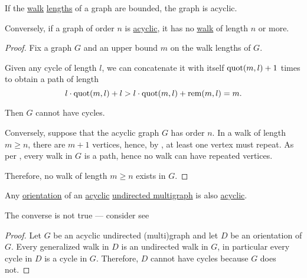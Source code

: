 \begin{proposition}\label{thm:acyclic_graph_walk_length}
  If the \hyperref[def:graph_walk]{walk} \hyperref[def:graph_walk/length]{lengths} of a graph are bounded, the graph is acyclic.

  Conversely, if a graph of  order \( n \) is \hyperref[def:acyclic_graph]{acyclic}, it has no \hyperref[def:graph_walk]{walk} of length \( n \) or more.
\end{proposition}
\begin{proof}
  \SufficiencySubProof Fix a graph \( G \) and an upper bound \( m \) on the walk lengths of \( G \).

  Given any cycle of length \( l \), we can concatenate it with itself \( \operatorname{quot}(m, l) + 1 \) times to obtain a path of length
  \begin{equation*}
    l \cdot \operatorname{quot}(m, l) + l > l \cdot \operatorname{quot}(m, l) + \operatorname{rem}(m, l) = m.
  \end{equation*}

  Then \( G \) cannot have cycles.

  \NecessitySubProof Conversely, suppose that the acyclic graph \( G \) has order \( n \). In a walk of length \( m \geq n \), there are \( m + 1 \) vertices, hence, by , at least one vertex must repeat. As per , every walk in \( G \) is a path, hence no walk can have repeated vertices.

  Therefore, no walk of length \( m \geq n \) exists in \( G \).
\end{proof}

\begin{proposition}\label{thm:acyclic_undirected_graph_orientation}
  Any \hyperref[def:multigraph_orientation]{orientation} of an \hyperref[def:acyclic_graph]{acyclic} \hyperref[def:hypergraph/multigraph]{undirected multigraph} is also \hyperref[def:acyclic_graph]{acyclic}.
\end{proposition}
\begin{comments}
  \item The converse is not true --- consider see 
\end{comments}
\begin{proof}
  Let \( G \) be an acyclic undirected (multi)graph and let \( D \) be an orientation of \( G \). Every generalized walk in \( D \) is an undirected walk in \( G \), in particular every cycle in \( D \) is a cycle in \( G \). Therefore, \( D \) cannot have cycles because \( G \) does not.
\end{proof}

